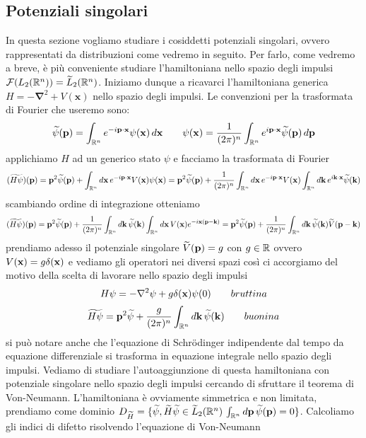 \subsection{Potenziali singolari}
In questa sezione vogliamo studiare i cosiddetti potenziali singolari, ovvero rappresentati da distribuzioni come vedremo in seguito. Per farlo, come vedremo a breve, è più conveniente studiare l'hamiltoniana nello spazio degli impulsi $\mathcal{F}(L_2(\mathbb{R}^n)) =  \widetilde{L}_2(\mathbb{R}^n)$. Iniziamo dunque a ricavarci l'hamiltoniana generica $H = -\mathbf{\nabla}^2 +V(\mathbf{x})$ nello spazio degli impulsi. Le convenzioni per la trasformata di Fourier che useremo sono:
\[\widetilde{\psi}(\mathbf{p}) = \int_{\mathbb{R}^n}e^{-i\mathbf{p}\cdot \mathbf{x}}\psi(\mathbf{x})\,d\mathbf{x} \qquad \psi(\mathbf{x}) = \frac{1}{(2\pi)^n}\int_{\mathbb{R}^n}e^{i\mathbf{p}\cdot \mathbf{x}}\widetilde{\psi}(\mathbf{p})\,d\mathbf{p} \]
applichiamo $H$ ad un generico stato $\psi$ e facciamo la trasformata di Fourier
\[(\widetilde{H\psi})(\mathbf{p}) = \mathbf{p}^2 \widetilde{\psi}(\mathbf{p}) + \int_{\mathbb{R}^n} d\mathbf{x}\, e^{-i\mathbf{p}\cdot\mathbf{x}}V(\mathbf{x})\psi(\mathbf{x}) = \mathbf{p}^2 \widetilde{\psi}(\mathbf{p}) + \frac{1}{(2\pi)^n}\int_{\mathbb{R}^n} d\mathbf{x}\, e^{-i\mathbf{p}\cdot\mathbf{x}}V(\mathbf{x})\int_{\mathbb{R}^n}d\mathbf{k}\,e^{i\mathbf{k}\cdot \mathbf{x}}\widetilde{\psi}(\mathbf{k}) \]
scambiando ordine di integrazione otteniamo
\[(\widetilde{H\psi})(\mathbf{p})= \mathbf{p}^2 \widetilde{\psi}(\mathbf{p}) + \frac{1}{(2\pi)^n}\int_{\mathbb{R}^n} d\mathbf{k}\,\widetilde{\psi}(\mathbf{k})\int_{\mathbb{R}^n}d\mathbf{x}\, V(\mathbf{x})e^{-i\mathbf{x}(\mathbf{p}- \mathbf{k})}  =   \mathbf{p}^2 \widetilde{\psi}(\mathbf{p}) + \frac{1}{(2\pi)^n}\int_{\mathbb{R}^n} d\mathbf{k}\,\widetilde{\psi}(\mathbf{k})\widetilde{V}(\mathbf{p}-\mathbf{k})\]
prendiamo adesso il potenziale singolare $\widetilde{V}(\mathbf{p}) = g$ con $g\in\mathbb{R}$ ovvero $V(\mathbf{x}) = g\delta(\mathbf{x})$ e vediamo gli operatori nei diversi spazi così ci accorgiamo del motivo della scelta di lavorare nello spazio degli impulsi
\[%
  H\psi = -\nabla^2\psi + g \delta(\x) \psi(0)\qquad bruttina\]%
\[ \widetilde{H\psi} =  \mathbf{p}^2 \widetilde{\psi} + \frac{g}{(2\pi)^n}\int_{\mathbb{R}^n} d\mathbf{k}\,\widetilde{\psi}(\mathbf{k})\qquad buonina
 \]
 si può notare anche che l'equazione di Schr{\"o}dinger indipendente dal tempo da equazione differenziale si trasforma in equazione integrale nello spazio degli impulsi. Vediamo di studiare l'autoaggiunzione di questa hamiltoniana con potenziale singolare nello spazio degli impulsi cercando di sfruttare il teorema di Von-Neumann. L'hamiltoniana è ovviamente simmetrica e non limitata, prendiamo come dominio $D_{\widetilde{H}} = \{\widetilde{\psi},\widetilde{H}\widetilde{\psi} \in \widetilde{L}_2(\mathbb{R}^n) \, \int_{\mathbb{R}^n}d\mathbf{p}\,\widetilde{\psi}(\mathbf{p}) = 0\}$. Calcoliamo gli indici di difetto risolvendo l'equazione di Von-Neumann
